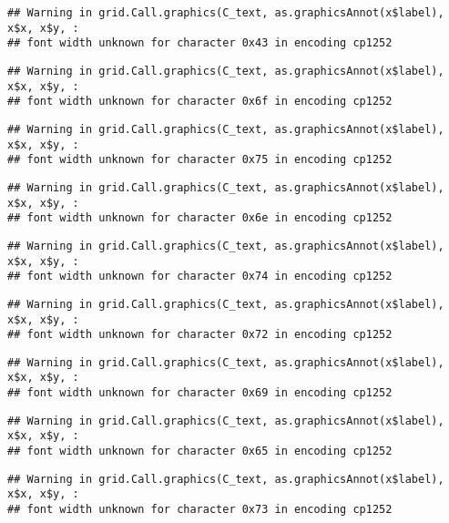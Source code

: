 \documentclass[
]{article}
\begin{document}
\begin{verbatim}
## Warning in grid.Call.graphics(C_text, as.graphicsAnnot(x$label), x$x, x$y, :
## font width unknown for character 0x43 in encoding cp1252
\end{verbatim}

\begin{verbatim}
## Warning in grid.Call.graphics(C_text, as.graphicsAnnot(x$label), x$x, x$y, :
## font width unknown for character 0x6f in encoding cp1252
\end{verbatim}

\begin{verbatim}
## Warning in grid.Call.graphics(C_text, as.graphicsAnnot(x$label), x$x, x$y, :
## font width unknown for character 0x75 in encoding cp1252
\end{verbatim}

\begin{verbatim}
## Warning in grid.Call.graphics(C_text, as.graphicsAnnot(x$label), x$x, x$y, :
## font width unknown for character 0x6e in encoding cp1252
\end{verbatim}

\begin{verbatim}
## Warning in grid.Call.graphics(C_text, as.graphicsAnnot(x$label), x$x, x$y, :
## font width unknown for character 0x74 in encoding cp1252
\end{verbatim}

\begin{verbatim}
## Warning in grid.Call.graphics(C_text, as.graphicsAnnot(x$label), x$x, x$y, :
## font width unknown for character 0x72 in encoding cp1252
\end{verbatim}

\begin{verbatim}
## Warning in grid.Call.graphics(C_text, as.graphicsAnnot(x$label), x$x, x$y, :
## font width unknown for character 0x69 in encoding cp1252
\end{verbatim}

\begin{verbatim}
## Warning in grid.Call.graphics(C_text, as.graphicsAnnot(x$label), x$x, x$y, :
## font width unknown for character 0x65 in encoding cp1252
\end{verbatim}

\begin{verbatim}
## Warning in grid.Call.graphics(C_text, as.graphicsAnnot(x$label), x$x, x$y, :
## font width unknown for character 0x73 in encoding cp1252
\end{verbatim}
\end{document}
